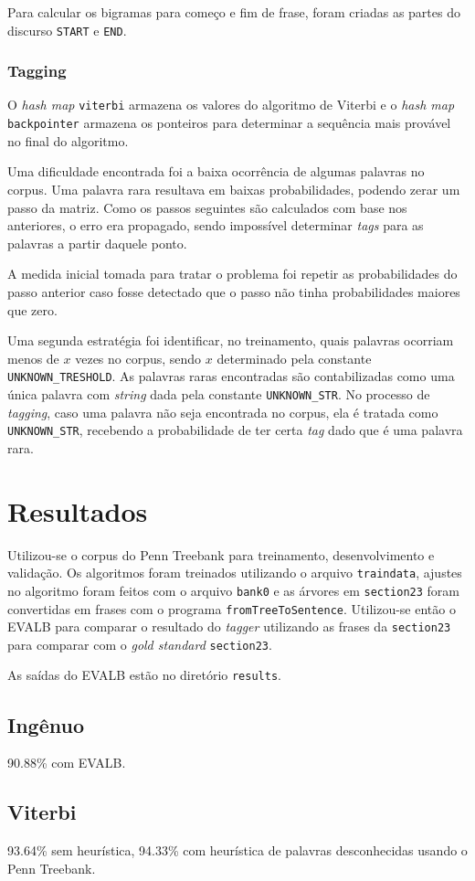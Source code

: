 \documentclass[12pt, a4paper]{article}
\newcommand{\code}[1]{{\lstinline{#1}}}
\begin{document}
Para calcular os bigramas para começo e fim de frase, foram criadas as partes do
discurso \code{START} e \code{END}.

\subsubsection{Tagging}
O \emph{hash map} \code{viterbi} armazena os valores do algoritmo de Viterbi e o
\emph{hash map} \code{backpointer} armazena os ponteiros para determinar a
sequência mais provável no final do algoritmo.

Uma dificuldade encontrada foi a baixa ocorrência de algumas palavras no
corpus. Uma palavra rara resultava em baixas probabilidades, podendo zerar um
passo da matriz. Como os passos seguintes são calculados com base nos
anteriores, o erro era propagado, sendo impossível determinar \emph{tags} para
as palavras a partir daquele ponto.

A medida inicial tomada para tratar o problema foi repetir as probabilidades do
passo anterior caso fosse detectado que o passo não tinha probabilidades maiores
que zero.

Uma segunda estratégia foi identificar, no treinamento, quais palavras ocorriam
menos de $ x $ vezes no corpus, sendo $ x $ determinado pela constante
\code{UNKNOWN_TRESHOLD}. As palavras raras encontradas são contabilizadas como uma
única palavra com \emph{string} dada pela constante \code{UNKNOWN_STR}. No
processo de \emph{tagging}, caso uma palavra não seja encontrada no corpus, ela
é tratada como \code{UNKNOWN_STR}, recebendo a probabilidade de ter certa \emph{tag} dado que é uma palavra rara.

\section{Resultados}
Utilizou-se o corpus do Penn Treebank para treinamento, desenvolvimento e
validação. Os algoritmos foram treinados utilizando o arquivo \code{traindata},
ajustes no algoritmo foram feitos com o arquivo \code{bank0} e as árvores em \code{section23}
foram convertidas em frases com o programa \code{fromTreeToSentence}.
Utilizou-se então o EVALB para comparar o resultado do \emph{tagger} utilizando
as frases da \code{section23} para comparar com o \emph{gold standard} \code{section23}.

As saídas do EVALB estão no diretório \code{results}.

\subsection{Ingênuo}
90.88\% com EVALB.

\subsection{Viterbi}
93.64\% sem heurística, 94.33\% com heurística de palavras desconhecidas usando o Penn Treebank.
\end{document}
